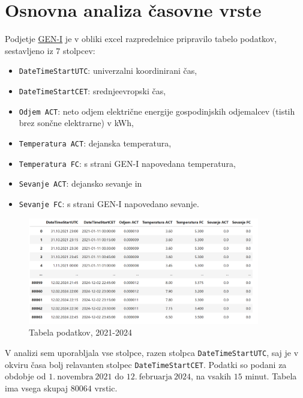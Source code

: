 \documentclass[a4paper, 11pt]{article}
\begin{document}
\pagebreak

\section{Osnovna analiza časovne vrste}

\noindent Podjetje \href{https://gen-i.si/}{GEN-I} je v obliki excel razpredelnice pripravilo tabelo podatkov, sestavljeno iz $7$ stolpcev:
\begin{itemize}
    \item  \texttt{DateTimeStartUTC}: univerzalni koordinirani čas,
    \item  \texttt{DateTimeStartCET}: srednjeevropski čas,
    \item  \texttt{Odjem ACT}: neto odjem električne energije gospodinjskih odjemalcev (tistih brez sončne elektrarne) v kWh,
    \item  \texttt{Temperatura ACT}: dejanska temperatura, 
    \item  \texttt{Temperatura FC}: s strani GEN-I napovedana temperatura,
    \item  \texttt{Sevanje ACT}: dejansko sevanje in
    \item  \texttt{Sevanje FC}: s strani GEN-I napovedano sevanje. 
\end{itemize}

\begin{figure}[h!]
    \centering
    \caption{Tabela podatkov, 2021-2024}\par\medskip
    \includegraphics[width=0.9\textwidth]{tabela.png}
\end{figure}

\noindent V analizi sem uporabljala vse stolpce, razen stolpca \texttt{DateTimeStartUTC}, saj je v 
okviru časa bolj relavanten stolpec \texttt{DateTimeStartCET}. Podatki so podani za obdobje od $1.~\text{novembra}~2021$ do $12.~\text{februarja}~2024$,
na vsakih $15$ minut. Tabela ima vsega skupaj $80064$ vrstic.

\end{document}

